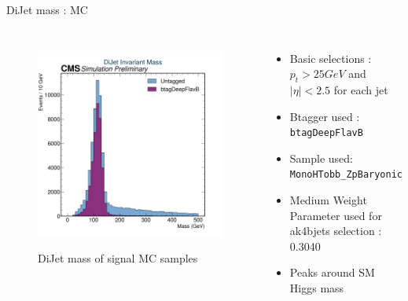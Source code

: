 \documentclass[10pt,xcolor=dvipsnames]{beamer}
\begin{document}
    
   \begin{frame}[fragile]{DiJet mass : MC} 
    \begin{columns}
    \begin{figure} 
    \centering 
     \includegraphics[width=1\textwidth]{../Archive/KinemPlots/DiJetsMC.png }
    \label{DiJetMC} 
    \caption{DiJet mass of signal MC samples}
    \end{figure} 
    \begin{itemize} 
    \raggedright 
    \small
    \item Basic selections : $p_t > 25 GeV $ and $|\eta | < 2.5 $ for each jet
    \item {Btagger used : \texttt{btagDeepFlavB}} 
    \item {Sample used: \texttt{MonoHTobb\_ZpBaryonic}} 
    \item Medium Weight Parameter used for ak4bjets selection : 0.3040
    \item Peaks around SM Higgs mass 
    \end{itemize}
    \end{columns} 
    \end{frame} 
    
\end{document}
